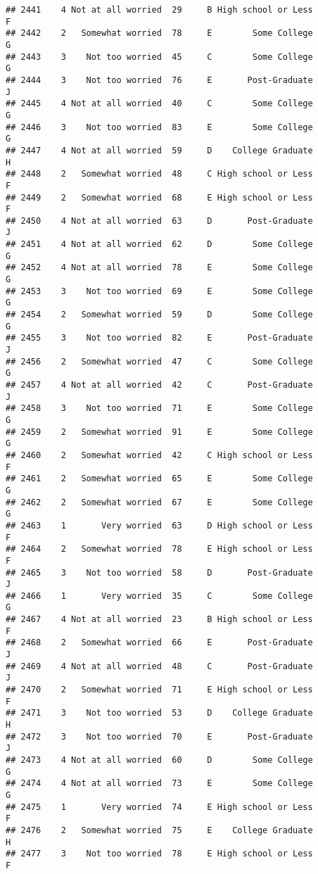 \documentclass[
]{article}
\begin{document}
\begin{verbatim}
## 2441    4 Not at all worried  29     B High school or Less         F
## 2442    2   Somewhat worried  78     E        Some College         G
## 2443    3    Not too worried  45     C        Some College         G
## 2444    3    Not too worried  76     E       Post-Graduate         J
## 2445    4 Not at all worried  40     C        Some College         G
## 2446    3    Not too worried  83     E        Some College         G
## 2447    4 Not at all worried  59     D    College Graduate         H
## 2448    2   Somewhat worried  48     C High school or Less         F
## 2449    2   Somewhat worried  68     E High school or Less         F
## 2450    4 Not at all worried  63     D       Post-Graduate         J
## 2451    4 Not at all worried  62     D        Some College         G
## 2452    4 Not at all worried  78     E        Some College         G
## 2453    3    Not too worried  69     E        Some College         G
## 2454    2   Somewhat worried  59     D        Some College         G
## 2455    3    Not too worried  82     E       Post-Graduate         J
## 2456    2   Somewhat worried  47     C        Some College         G
## 2457    4 Not at all worried  42     C       Post-Graduate         J
## 2458    3    Not too worried  71     E        Some College         G
## 2459    2   Somewhat worried  91     E        Some College         G
## 2460    2   Somewhat worried  42     C High school or Less         F
## 2461    2   Somewhat worried  65     E        Some College         G
## 2462    2   Somewhat worried  67     E        Some College         G
## 2463    1       Very worried  63     D High school or Less         F
## 2464    2   Somewhat worried  78     E High school or Less         F
## 2465    3    Not too worried  58     D       Post-Graduate         J
## 2466    1       Very worried  35     C        Some College         G
## 2467    4 Not at all worried  23     B High school or Less         F
## 2468    2   Somewhat worried  66     E       Post-Graduate         J
## 2469    4 Not at all worried  48     C       Post-Graduate         J
## 2470    2   Somewhat worried  71     E High school or Less         F
## 2471    3    Not too worried  53     D    College Graduate         H
## 2472    3    Not too worried  70     E       Post-Graduate         J
## 2473    4 Not at all worried  60     D        Some College         G
## 2474    4 Not at all worried  73     E        Some College         G
## 2475    1       Very worried  74     E High school or Less         F
## 2476    2   Somewhat worried  75     E    College Graduate         H
## 2477    3    Not too worried  78     E High school or Less         F

\end{verbatim}
\end{document}
